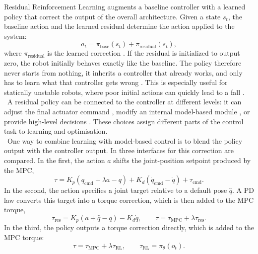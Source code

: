 Residual Reinforcement Learning augments a baseline controller with a learned
policy that correct the output of the overall architecture. Given a state \(s_t\), the
baseline action and the learned residual determine the action applied to the
system:
%
\begin{equation}
    a_t =
    \pi_{\mathrm{base}}(s_t) + \pi_{\mathrm{residual}}(s_t),
    \label{eq:residual_policy}
\end{equation}
%
where \(\pi_{\mathrm{residual}}\) is the learned correction
\cite{residual_policy,residual_robot_control}. If the residual is initialized
to output zero, the robot initially behaves exactly like the baseline. The
policy therefore never starts from nothing, it inherits a controller that
already works, and only has to learn what that controller
gets wrong \cite{residual_policy}. This is especially useful for statically unstable
robots, where poor initial actions can quickly lead to a fall
\cite{hybrid_balance}.\\
\
A residual policy can be connected to the controller at
different levels: it can adjust the final actuator command
\cite{residual_mpc,hybrid_balance}, modify an internal model-based module
\cite{modular_residual,model_gap}, or provide high-level
decisions \cite{non_gaited}. These choices
assign different parts of the control task to learning and optimisation.\\
\
One way to combine learning with model-based control is to blend the policy
output with the controller output. In \cite{residual_mpc} three interfaces
for this correction are compared. In the first, the action \(a\) shifts
the joint-position setpoint produced by the MPC,
%
\begin{equation}
    \tau = K_p\left(q_{\mathrm{cmd}} + \lambda a - q\right)
    + K_d\left(\dot{q}_{\mathrm{cmd}} - \dot{q}\right) + \tau_{\mathrm{cmd}}.
    \label{eq:blend_joint_joint}
\end{equation}
%
In the second, the action specifies a joint target relative to a default pose
\(\hat{q}\). A PD law converts this target into a torque correction, which is
then added to the MPC torque,
%
\begin{equation}
    \tau_{\mathrm{res}} = K_p\left(a + \hat{q} - q\right) - K_d \dot{q},
    \qquad
    \tau = \tau_{\mathrm{MPC}} + \lambda \tau_{\mathrm{res}}.
    \label{eq:blend_joint_torque}
\end{equation}
%
In the third, the policy outputs a torque correction directly, which is added
to the MPC torque:
%
\begin{equation}
    \tau = \tau_{\mathrm{MPC}} + \lambda \tau_{\mathrm{RL}},
    \qquad \tau_{\mathrm{RL}} = \pi_\theta(o_t).
    \label{eq:blend_direct_torque}
\end{equation}
